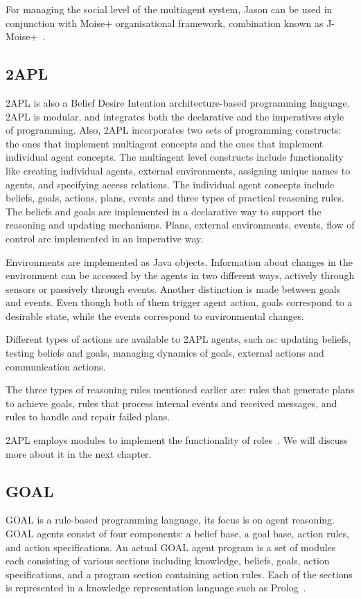 \documentclass[a4paper,12pt,oneside,fleqn]{book} %
\begin{document}
For managing the social level of the multiagent system, Jason can be used
in conjunction with Moise+ organisational framework, combination known as
J-Moise+~\cite{hubner2007j}.


\subsection{2APL} %
2APL is also a Belief Desire Intention architecture-based programming
language. 2APL is modular, and integrates both the declarative and the
imperatives style of programming. Also, 2APL incorporates two sets of
programming constructs: the ones that implement multiagent concepts and the
ones that implement individual agent concepts. The multiagent level
constructs include functionality like creating individual agents, external
environments, assigning unique names to agents, and specifying access
relations. The individual agent concepts include beliefs, goals, actions,
plans, events and three types of practical reasoning rules. The beliefs and
goals are implemented in a declarative way to support the reasoning and
updating mechanisms. Plans, external environments, events, flow of control
are implemented in an imperative way.

Environments are implemented as Java objects. Information about changes in
the environment can be accessed by the agents in two different ways,
actively through sensors or passively through events. Another distinction
is made between goals and events. Even though both of them trigger agent
action, goals correspond to a desirable state, while the events correspond
to environmental changes.

Different types of actions are available to 2APL agents, such as: updating
beliefs, testing beliefs and goals, managing dynamics of goals, external
actions and communication actions.

The three types of reasoning rules mentioned earlier are: rules that
generate plans to achieve goals, rules that process internal events and
received messages, and rules to handle and repair failed plans.

2APL employs modules to implement the functionality of
roles~\cite{dblp:conf/prima/dastanims08}. We will discuss more about it in
the next chapter.

\subsection{GOAL} %
GOAL is a rule-based programming language, its focus is on agent reasoning.
GOAL agents consist of four components: a belief base, a goal base, action
rules, and action specifications. An actual GOAL agent program is a set of
modules each consisting of various sections including knowledge, beliefs,
goals, action specifications, and a program section containing action
rules. Each of the sections is represented in a knowledge representation
language such as Prolog~\cite{DBLP:books/daglib/0076175}.
\end{document}
